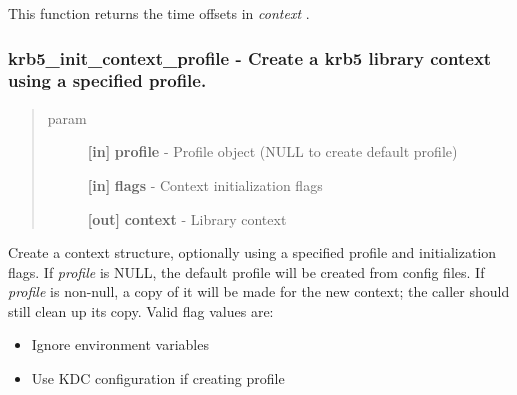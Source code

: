 \documentclass[letterpaper,10pt,english]{sphinxmanual}
\begin{document}
This function returns the time offsets in \emph{context} .


\subsubsection{krb5\_init\_context\_profile -  Create a krb5 library context using a specified profile.}
\label{appdev/refs/api/krb5_init_context_profile:krb5-init-context-profile-create-a-krb5-library-context-using-a-specified-profile}\label{appdev/refs/api/krb5_init_context_profile::doc}

\begin{fulllineitems}
\label{appdev/refs/api/krb5_init_context_profile:c.krb5_init_context_profile}
\end{fulllineitems}

\begin{quote}\begin{description}
\item[{param}] \leavevmode
\textbf{{[}in{]}} \textbf{profile} - Profile object (NULL to create default profile)

\textbf{{[}in{]}} \textbf{flags} - Context initialization flags

\textbf{{[}out{]}} \textbf{context} - Library context

\end{description}\end{quote}

Create a context structure, optionally using a specified profile and initialization flags. If \emph{profile} is NULL, the default profile will be created from config files. If \emph{profile} is non-null, a copy of it will be made for the new context; the caller should still clean up its copy. Valid flag values are:
\begin{itemize}
\item {} 
{\hyperref[appdev/refs/macros/KRB5_INIT_CONTEXT_SECURE:KRB5_INIT_CONTEXT_SECURE]{}} Ignore environment variables

\item {} 
{\hyperref[appdev/refs/macros/KRB5_INIT_CONTEXT_KDC:KRB5_INIT_CONTEXT_KDC]{}} Use KDC configuration if creating profile

\end{itemize}
\end{document}
